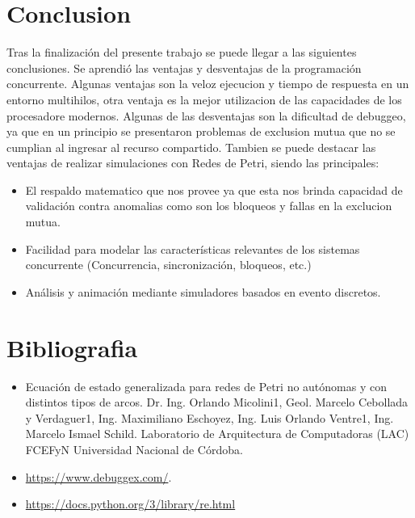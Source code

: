 \documentclass{article}
\begin{document}
\section{Conclusion}
	Tras la finalización del presente trabajo se puede llegar a las siguientes conclusiones.
	Se aprendió las ventajas y desventajas de la programación concurrente. Algunas ventajas son la veloz ejecucion y tiempo de respuesta en un entorno multihilos, otra ventaja es la mejor utilizacion de las capacidades de los procesadore modernos. Algunas de las desventajas son la dificultad de debuggeo, ya que en un principio se presentaron problemas de exclusion mutua que no se cumplian al ingresar al recurso compartido.\newline
	Tambien se puede destacar las ventajas de realizar simulaciones con Redes de Petri, siendo las principales:
	\begin{itemize}
		\item El respaldo matematico que nos provee ya que esta nos brinda capacidad de validación 
		contra anomalias como son los bloqueos y fallas en la exclucion mutua.
		\item Facilidad para modelar las características relevantes de los sistemas concurrente (Concurrencia, 
		sincronización, bloqueos, etc.)
		\item Análisis y animación mediante simuladores basados en evento discretos.
	\end{itemize}
	
\section{Bibliografia}
	\begin{itemize}
		\item Ecuación de estado generalizada para redes de Petri no autónomas y con distintos tipos de arcos. Dr. Ing. Orlando Micolini1, Geol. Marcelo Cebollada y Verdaguer1, Ing. Maximiliano Eschoyez, Ing. Luis Orlando Ventre1, Ing. Marcelo Ismael Schild. Laboratorio de Arquitectura de Computadoras (LAC) FCEFyN Universidad Nacional de Córdoba.
		\item \url{https://www.debuggex.com/}.
		\item \href {https://docs.python.org/3/library/re.html}{https://docs.python.org/3/library/re.html}
	\end{itemize}
\end{document}
